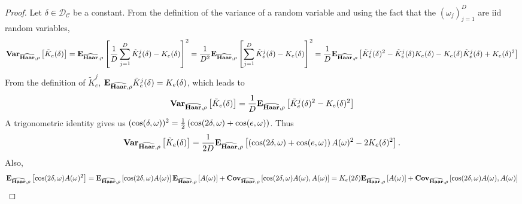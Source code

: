 \begin{proof}
    Let $\delta\in\mathcal{D}_{\mathcal{C}}$ be a constant. From the definition
    of the variance of a random variable and using the fact that the
    $(\omega_j)_{j=1}^D$ are \ac{iid} random variables,
    \begin{dmath*}
        \variance_{\dual{\Haar}, \rho} \left[ \tilde{K}_e(\delta) \right]
        = \expectation_{\dual{\Haar}, \rho}\left[ \frac{1}{D} \sum_{j=1}^D
        \tilde{K}^j_e(\delta) - K_e(\delta) \right]^2
        = \frac{1}{D^2} \expectation_{\dual{\Haar}, \rho}\left[ \sum_{j=1}^D
        \tilde{K}^j_e(\delta) - K_e(\delta) \right]^2
        = \frac{1}{D} \expectation_{\dual{\Haar}, \rho} \left[
        \tilde{K}_e^j(\delta)^2 - \tilde{K}_e^j(\delta)K_e(\delta) - 
        K_e(\delta)\tilde{K}_e^j(\delta) + K_e(\delta)^2 \right]
    \end{dmath*}
    From the definition of $\tilde{K}^j_e$, ${\mathbf{{E}}}_{\widehat{\mathbf{Haar}}, \rho}
    \tilde{K}^j_e(\delta) = K_e(\delta)$, which leads to
    \begin{dmath*}
        \variance_{\dual{\Haar}, \rho} \left[ \tilde{K}_e(\delta) \right]
        = \frac{1}{D} \expectation_{\dual{\Haar}, \rho} \left[
        \tilde{K}^j_e(\delta)^2 - K_e(\delta)^2 \right]
    \end{dmath*}
    A trigonometric identity gives us $(\cos(\delta,
    \omega))^2=\frac{1}{2}\left( \cos(2\delta, \omega) +
    \cos(e, \omega) \right)$. Thus
    \begin{dmath*}
        \variance_{\dual{\Haar}, \rho} \left[ \tilde{K}_e(\delta) \right]
        = \frac{1}{2D} \expectation_{\dual{\Haar}, \rho} \left[ \left(
        \cos\pairing{2\delta, \omega} + \cos\pairing{e, \omega} \right)
        A(\omega)^2 - 2 K_e(\delta)^2 \right].
    \end{dmath*}
    Also,
    \begin{dmath*}
        \expectation_{\dual{\Haar}, \rho} \left[ \cos\pairing{2\delta, \omega}
        A(\omega)^2 \right] 
        = \expectation_{\dual{\Haar}, \rho}\left[ \cos\pairing{2\delta, \omega}
        A(\omega) \right] \expectation_{\dual{\Haar}, \rho}\left[ A(\omega)
        \right] + \covariances_{\dual{\Haar}, \rho}\left[ \cos\pairing{2\delta,
        \omega} A(\omega), A(\omega) \right]
        = K_e(2\delta) \expectation_{\dual{\Haar}, \rho}\left[ A(\omega)
        \right] + \covariances_{\dual{\Haar}, \rho}\left[ \cos\pairing{2\delta,
        \omega} A(\omega), A(\omega) \right]
    \end{dmath*}

\end{proof}
